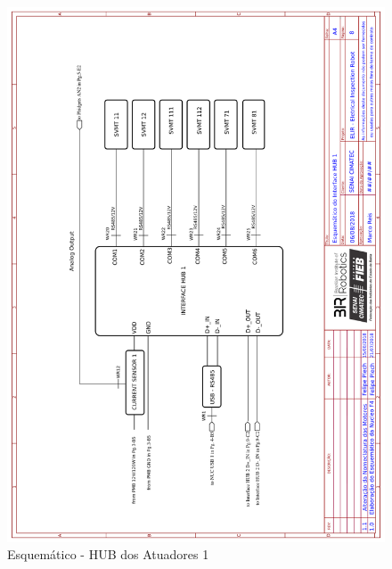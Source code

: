 	
    \begin{figure}[h]
	\centering
	\includegraphics[width=14cm]{Figures/EsquematicoHUB1.png}
	\caption{Esquemático - HUB dos Atuadores 1} \label{HUB1}
	\end{figure}
	
	\pagebreak

